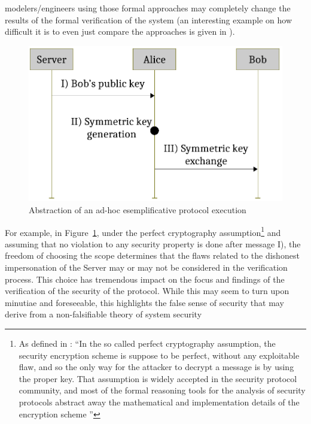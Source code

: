 \documentclass[conference]{IEEEtran}
\begin{document}
modelers/engineers using those formal approaches may completely change the
results of the formal verification of the system (an interesting example on how
difficult it is to even just compare the approaches is given in
\autocite{Cremers2009comparing}). 
\begin{figure}[t]
	\centering
	\includegraphics[width=.7\columnwidth]{protocol-example.pdf}
	\caption{Abstraction of an ad-hoc esemplificative protocol execution}
	\label{fig:protocol-example}
\end{figure}
For example, in Figure~\ref{fig:protocol-example}, under the perfect
cryptography assumption\footnote{As defined in \autocite{Rocchetto2016cpdy}: ``In
the so called perfect cryptography assumption, the security encryption scheme
is suppose to be perfect, without any exploitable flaw, and so the only way for
the attacker to decrypt a message is by using the proper key. That assumption
is widely accepted in the security protocol community, and most of the formal
reasoning tools for the analysis of security protocols abstract away the
mathematical and implementation details of the encryption scheme
\autocite{Turuani2006clatse,Basin2005ofmc,Armando2016satmc,Rocchetto2017interpolation}''}
and assuming that no violation to any security property is done after message
I), the freedom of choosing the scope
determines that the flaws related to the dishonest impersonation of the Server
may or may not be considered in the verification process.  This choice has
tremendous impact on the focus and findings of the verification of the security
of the protocol.  While this may seem to turn upon minutiae and foreseeable,
this highlights the false sense of security that may derive from a
non-falsifiable theory of system security
\end{document}
